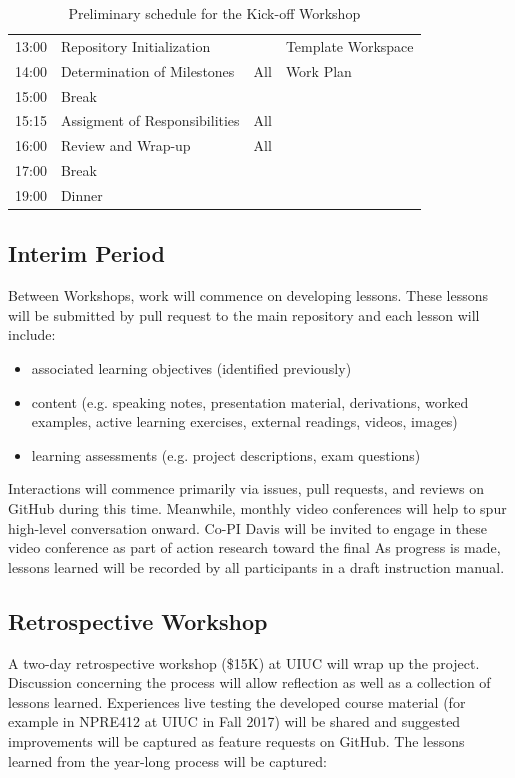 \documentclass[11pt]{article}
\begin{document}
\begin{table}[h!]
\begin{tabularx}{\textwidth}{r|l|l|X}
13:00& Repository Initialization&&  Template Workspace\\
14:00& Determination of Milestones& All& Work Plan\\
15:00& Break&&  \\
15:15& Assigment of Responsibilities& All&  \\
16:00& Review and Wrap-up& All&  \\
17:00& Break&&  \\
19:00& Dinner&&  \\
\hline
                  \end{tabularx}
                  \caption{Preliminary schedule for the Kick-off Workshop}
                  \label{tab:kickoff}
          \end{table}


          \subsection{Interim Period}
          Between Workshops, work will commence on developing 
          lessons. These lessons will be submitted by pull request to the main 
          repository and each lesson will include:
          \begin{itemize} 
                  \item associated learning objectives (identified previously)
                \item content (e.g. speaking notes, presentation material, 
                        derivations, worked examples, active learning  
                          exercises, external readings, videos, images)
                  \item learning assessments (e.g. project descriptions, exam questions) 
          \end{itemize} 

          Interactions will commence primarily via issues, pull requests, and 
          reviews on GitHub during this time. Meanwhile, monthly video 
          conferences will help to spur high-level conversation onward.
          Co-PI Davis will be invited to engage in these video conference as 
          part of action research toward the final 
          As progress is made, lessons learned will be recorded by all 
          participants in a draft instruction manual. 

          \subsection{Retrospective Workshop}
          A two-day retrospective workshop (\$15K) at UIUC will wrap up the 
          project. Discussion concerning the process will allow reflection as 
          well as a collection of lessons learned.
          Experiences live testing the developed course material (for example 
          in NPRE412 at UIUC in Fall 2017) will be shared and suggested 
          improvements will be captured as feature requests on GitHub.  
          The lessons learned from the year-long process will be captured:
          
\end{document}
